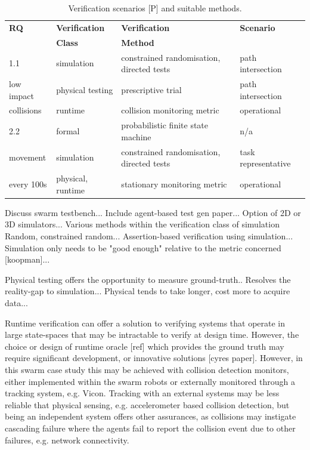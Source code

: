 \documentclass[lettersize,journal]{IEEEtran}
\begin{document}
\begin{table}[t]
\caption{Verification scenarios [P] and suitable methods.}\label{tab:testgen}
\centering
\begin{tabular}{llll}

\textbf{RQ}   & \textbf{Verification}  & \textbf{Verification} & \textbf{Scenario} \\ 
              & \textbf{Class}         & \textbf{Method}		  & 		          \\ 
\hline
1.1 	      & simulation 	   & constrained randomisation, directed tests & path intersection     \\
low impact    & physical testing   & prescriptive trial 				       & path intersection	 \\
collisions    & runtime		   & collision monitoring metric 		       & operational		 \\
\hline
2.2 	      & formal 	 	   & probabilistic finite state machine 	   & n/a      \\
movement      & simulation 	   & constrained randomisation, directed tests & task representative     \\
every 100s    & physical, runtime  & stationary monitoring metric 			   & operational		 \\
\hline
\end{tabular}
\end{table}




Discuss swarm testbench...
Include agent-based test gen paper...
Option of 2D or 3D simulators...
Various methods within the verification class of simulation
Random, constrained random...
Assertion-based verification using simulation...
Simulation only needs to be "good enough" relative to the metric concerned [koopman]...

Physical testing offers the opportunity to measure ground-truth..
Resolves the reality-gap to simulation...
Physical tends to take longer, cost more to acquire data...

Runtime verification can offer a solution to verifying systems that operate in large state-spaces that may be intractable to verify at design time. However, the choice or design of runtime oracle [ref] which provides the ground truth may require significant development, or innovative solutions [cyres paper]. However, in this swarm case study this may be achieved with collision detection monitors, either implemented within the swarm robots or externally monitored through a tracking system, e.g. Vicon. Tracking with an external systems may be less reliable that physical sensing, e.g. accelerometer based collision detection, but being an independent system offers other assurances, as collisions may instigate cascading failure where the agents fail to report the collision event due to other failures, e.g. network connectivity.
\end{document}
